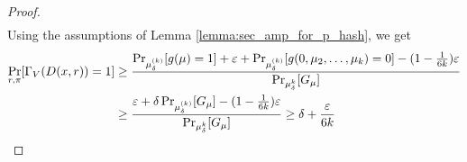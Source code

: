 \begin{proof}
\begin{align*}
 \end{align*}
 Using the assumptions of Lemma \ref{lemma:sec_amp_for_p_hash}, we get
 \begin{align*}
   \underset{r,\pi}{\Pr}[\Gamma_V(D(x,r)) = 1]
 &\geq \frac{ {\Pr}_{\mu_{\delta}^{(k)}}[g(\mu) = 1] + \epsilon +
 \Pr_{\mu_{\delta}^{(k)}}[g(0, \mu_2, \dots, \mu_k) = 0] - (1 - \frac{1}{6k})\epsilon}
 {\Pr_{\mu_{\delta}^{k}}[G_{\mu}]} \notag\\
 &\geq \frac{\epsilon +
\delta\Pr_{\mu_{\delta}^{(k)}}[G_{\mu}] - (1 - \frac{1}{6k})\epsilon}
{\Pr_{\mu_{\delta}^{k}}[G_{\mu}]} \geq \delta + \frac{\epsilon}{6k}
\end{align*}

\end{proof}

